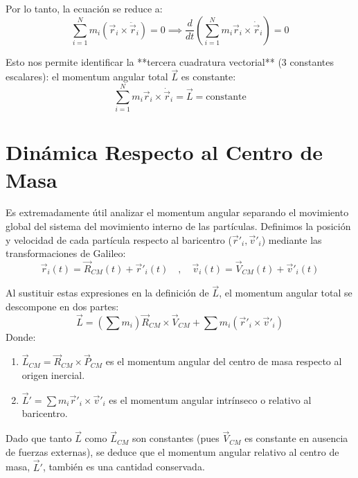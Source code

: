 \documentclass[a4paper]{article}
\begin{document}
Por lo tanto, la ecuación se reduce a:
\begin{equation}
    \sum_{i=1}^N m_i (\vec{r}_i \times \ddot{\vec{r}}_i) = 0 \implies \frac{d}{dt} \left( \sum_{i=1}^N m_i \vec{r}_i \times \dot{\vec{r}}_i \right) = 0
\end{equation}

Esto nos permite identificar la **tercera cuadratura vectorial** (3 constantes escalares): el momentum angular total $\vec{L}$ es constante:
\begin{equation}
    \sum_{i=1}^N m_i \vec{r}_i \times \dot{\vec{r}}_i = \vec{L} = \text{constante}
\end{equation}

\section{Dinámica Respecto al Centro de Masa}

Es extremadamente útil analizar el momentum angular separando el movimiento global del sistema del movimiento interno de las partículas. Definimos la posición y velocidad de cada partícula respecto al baricentro ($\vec{r}'_i, \vec{v}'_i$) mediante las transformaciones de Galileo:
\begin{equation}
    \vec{r}_i(t) = \vec{R}_{CM}(t) + \vec{r}'_i(t) \quad , \quad \vec{v}_i(t) = \vec{V}_{CM}(t) + \vec{v}'_i(t)
\end{equation}

Al sustituir estas expresiones en la definición de $\vec{L}$, el momentum angular total se descompone en dos partes:
\begin{equation}
    \vec{L} = (\sum m_i) \vec{R}_{CM} \times \vec{V}_{CM} + \sum m_i (\vec{r}'_i \times \vec{v}'_i)
\end{equation}
Donde:
\begin{enumerate}
    \item $\vec{L}_{CM} = \vec{R}_{CM} \times \vec{P}_{CM}$ es el momentum angular del centro de masa respecto al origen inercial.
    \item $\vec{L}' = \sum m_i \vec{r}'_i \times \vec{v}'_i$ es el momentum angular intrínseco o relativo al baricentro.
\end{enumerate}

Dado que tanto $\vec{L}$ como $\vec{L}_{CM}$ son constantes (pues $\vec{V}_{CM}$ es constante en ausencia de fuerzas externas), se deduce que el momentum angular relativo al centro de masa, $\vec{L}'$, también es una cantidad conservada.
\end{document}
